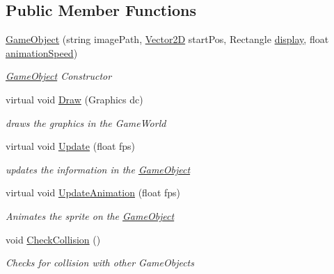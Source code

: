 \subsection*{Public Member Functions}
\begin{DoxyCompactItemize}
\item 
\hyperlink{class_mage_twinstick_1_1_game_object_a70fd6f506e37d368c4b5dc324286e0ec}{Game\+Object} (string image\+Path, \hyperlink{class_mage_twinstick_1_1_vector2_d}{Vector2\+D} start\+Pos, Rectangle \hyperlink{class_mage_twinstick_1_1_game_object_a5807df7f837dc87c8955a008d0b27b50}{display}, float \hyperlink{class_mage_twinstick_1_1_game_object_a5d21c31402c27c5a19f2a62d98720456}{animation\+Speed})
\begin{DoxyCompactList}\small\item\em \hyperlink{class_mage_twinstick_1_1_game_object}{Game\+Object} Constructor \end{DoxyCompactList}\item 
virtual void \hyperlink{class_mage_twinstick_1_1_game_object_a11628f4d9b508e2d976ca25f716b74f5}{Draw} (Graphics dc)
\begin{DoxyCompactList}\small\item\em draws the graphics in the Game\+World \end{DoxyCompactList}\item 
virtual void \hyperlink{class_mage_twinstick_1_1_game_object_a3de8248d06d234f8335525bbb28ccacc}{Update} (float fps)
\begin{DoxyCompactList}\small\item\em updates the information in the \hyperlink{class_mage_twinstick_1_1_game_object}{Game\+Object} \end{DoxyCompactList}\item 
virtual void \hyperlink{class_mage_twinstick_1_1_game_object_a35d6d9af3335b978c618ab73da1215a0}{Update\+Animation} (float fps)
\begin{DoxyCompactList}\small\item\em Animates the sprite on the \hyperlink{class_mage_twinstick_1_1_game_object}{Game\+Object} \end{DoxyCompactList}\item 
void \hyperlink{class_mage_twinstick_1_1_game_object_a5ed64726e236792a162c2899b7446d66}{Check\+Collision} ()
\begin{DoxyCompactList}\small\item\em Checks for collision with other Game\+Objects \end{DoxyCompactList}\item 

\end{DoxyCompactItemize}
